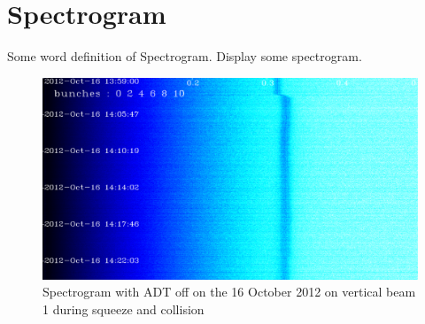 \section{Spectrogram}

Some word definition of Spectrogram. Display some spectrogram.

\begin{figure}[H]
	\caption{Spectrogram with ADT off on the 16 October 2012 on vertical beam 1 during squeeze and collision}
	\centering
	\includegraphics[scale=0.3]{md-121016-vb1-m1-6bunches-10acc-1359-1425-collision.pdf}
\end{figure}